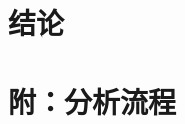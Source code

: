 \documentclass[
]{article}
\begin{document}
\begin{center}\vspace{1.5cm}\end{center}

\hypertarget{dis}{%
\section{结论}\label{dis}}

\newpage

\hypertarget{workflow}{%
\section{附：分析流程}\label{workflow}}
\end{document}
